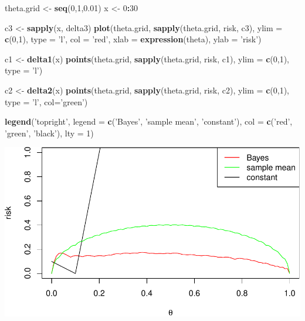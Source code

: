\documentclass[
]{article}
\newenvironment{Shaded}{\begin{snugshade}}{\end{snugshade}}
\newcommand{\DataTypeTok}[1]{\textcolor[rgb]{0.13,0.29,0.53}{#1}}
\newcommand{\DecValTok}[1]{\textcolor[rgb]{0.00,0.00,0.81}{#1}}
\newcommand{\FloatTok}[1]{\textcolor[rgb]{0.00,0.00,0.81}{#1}}
\newcommand{\KeywordTok}[1]{\textcolor[rgb]{0.13,0.29,0.53}{\textbf{#1}}}
\newcommand{\NormalTok}[1]{#1}
\newcommand{\OperatorTok}[1]{\textcolor[rgb]{0.81,0.36,0.00}{\textbf{#1}}}
\newcommand{\StringTok}[1]{\textcolor[rgb]{0.31,0.60,0.02}{#1}}
\begin{document}
\begin{Shaded}
\begin{Highlighting}[]
\NormalTok{theta.grid <-}\StringTok{ }\KeywordTok{seq}\NormalTok{(}\DecValTok{0}\NormalTok{,}\DecValTok{1}\NormalTok{,}\FloatTok{0.01}\NormalTok{)}
\NormalTok{x <-}\StringTok{ }\DecValTok{0}\OperatorTok{:}\DecValTok{30}

\NormalTok{c3 <-}\StringTok{ }\KeywordTok{sapply}\NormalTok{(x, delta3)}
\KeywordTok{plot}\NormalTok{(theta.grid, }\KeywordTok{sapply}\NormalTok{(theta.grid, risk, c3), }
     \DataTypeTok{ylim =} \KeywordTok{c}\NormalTok{(}\DecValTok{0}\NormalTok{,}\DecValTok{1}\NormalTok{), }\DataTypeTok{type =} \StringTok{'l'}\NormalTok{, }\DataTypeTok{col =} \StringTok{'red'}\NormalTok{, }\DataTypeTok{xlab =} \KeywordTok{expression}\NormalTok{(theta), }\DataTypeTok{ylab =} \StringTok{'risk'}\NormalTok{)}

\NormalTok{c1 <-}\StringTok{ }\KeywordTok{delta1}\NormalTok{(x)}
\KeywordTok{points}\NormalTok{(theta.grid, }\KeywordTok{sapply}\NormalTok{(theta.grid, risk, c1), }
       \DataTypeTok{ylim =} \KeywordTok{c}\NormalTok{(}\DecValTok{0}\NormalTok{,}\DecValTok{1}\NormalTok{), }\DataTypeTok{type =} \StringTok{'l'}\NormalTok{)}

\NormalTok{c2 <-}\StringTok{ }\KeywordTok{delta2}\NormalTok{(x)}
\KeywordTok{points}\NormalTok{(theta.grid, }\KeywordTok{sapply}\NormalTok{(theta.grid, risk, c2), }
       \DataTypeTok{ylim =} \KeywordTok{c}\NormalTok{(}\DecValTok{0}\NormalTok{,}\DecValTok{1}\NormalTok{), }\DataTypeTok{type =} \StringTok{'l'}\NormalTok{, }\DataTypeTok{col=}\StringTok{'green'}\NormalTok{)}

\KeywordTok{legend}\NormalTok{(}\StringTok{'topright'}\NormalTok{, }\DataTypeTok{legend =} \KeywordTok{c}\NormalTok{(}\StringTok{'Bayes'}\NormalTok{, }\StringTok{'sample mean'}\NormalTok{, }\StringTok{'constant'}\NormalTok{), }
       \DataTypeTok{col =} \KeywordTok{c}\NormalTok{(}\StringTok{'red'}\NormalTok{, }\StringTok{'green'}\NormalTok{, }\StringTok{'black'}\NormalTok{), }\DataTypeTok{lty =} \DecValTok{1}\NormalTok{)}
\end{Highlighting}
\end{Shaded}

\includegraphics{lab-03_files/figure-latex/unnamed-chunk-8-1.pdf}
\end{document}
